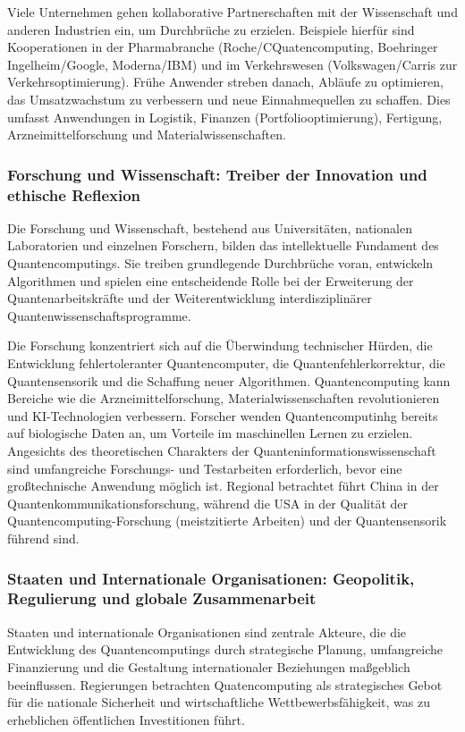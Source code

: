 Viele Unternehmen gehen kollaborative Partnerschaften mit der Wissenschaft und anderen Industrien ein, um Durchbrüche zu erzielen.\cite{noauthor_how_2025} Beispiele hierfür sind Kooperationen in der Pharmabranche (Roche/CQuatencomputing, Boehringer Ingelheim/Google, Moderna/IBM) und im Verkehrswesen (Volkswagen/Carris zur Verkehrsoptimierung). \cite{team_impact_2024} Frühe Anwender streben danach, Abläufe zu optimieren, das Umsatzwachstum zu verbessern und neue Einnahmequellen zu schaffen.\cite{noauthor_how_2025} Dies umfasst Anwendungen in Logistik, Finanzen (Portfoliooptimierung), Fertigung, Arzneimittelforschung und Materialwissenschaften.\cite{noauthor_economic_nodate}


\subsubsection{Forschung und Wissenschaft: Treiber der Innovation und ethische Reflexion}
Die Forschung und Wissenschaft, bestehend aus Universitäten, nationalen Laboratorien und einzelnen Forschern, bilden das intellektuelle Fundament des Quantencomputings. Sie treiben grundlegende Durchbrüche voran, entwickeln Algorithmen und spielen eine entscheidende Rolle bei der Erweiterung der Quantenarbeitskräfte und der Weiterentwicklung interdisziplinärer Quantenwissenschaftsprogramme.\cite{noauthor_what_nodate} 

Die Forschung konzentriert sich auf die Überwindung technischer Hürden, die Entwicklung fehlertoleranter Quantencomputer, die Quantenfehlerkorrektur, die Quantensensorik und die Schaffung neuer Algorithmen. Quantencomputing kann Bereiche wie die Arzneimittelforschung, Materialwissenschaften revolutionieren und KI-Technologien verbessern.\cite{bond_quantum_2025} Forscher wenden Quantencomputinhg bereits auf biologische Daten an, um Vorteile im maschinellen Lernen zu erzielen. Angesichts des theoretischen Charakters der Quanteninformationswissenschaft sind umfangreiche Forschungs- und Testarbeiten erforderlich, bevor eine großtechnische Anwendung möglich ist.\cite{noauthor_power_nodate} Regional betrachtet führt China in der Quantenkommunikationsforschung, während die USA in der Qualität der Quantencomputing-Forschung (meistzitierte Arbeiten) und der Quantensensorik führend sind.

\subsubsection{Staaten und Internationale Organisationen: Geopolitik, Regulierung und globale Zusammenarbeit}
Staaten und internationale Organisationen sind zentrale Akteure, die die Entwicklung des Quantencomputings durch strategische Planung, umfangreiche Finanzierung und die Gestaltung internationaler Beziehungen maßgeblich beeinflussen. Regierungen betrachten Quatencomputing als strategisches Gebot für die nationale Sicherheit und wirtschaftliche Wettbewerbsfähigkeit, was zu erheblichen öffentlichen Investitionen führt.\cite{noauthor_europes_2025}

